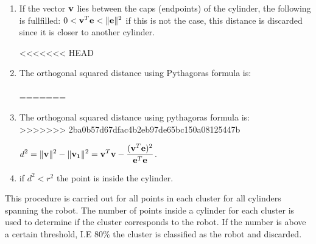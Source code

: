 \begin{enumerate}
\item If the vector $\bf v$ lies between the caps (endpoints) of the cylinder, the following is fullfilled: $ 0 < {\bf v}^T{\bf e} < \| {\bf e}\|^2$ if this is not the case, this distance is discarded since it is closer to another cylinder. 

<<<<<<< HEAD
\item The orthogonal squared distance using Pythagoras formula is:\\\\
=======
\item The orthogonal squared distance using pythagoras formula is:\\
>>>>>>> 2ba0b57d67dfac4b2eb97de65bc150a08125447b
\begin{center}
$\displaystyle d^2 = \|{\bf v}\|^2 - \|{\bf v_1}\|^2= {\bf v}^T{\bf v} -\frac{({\bf v}^T{\bf e})^2}{{\bf e}^T {\bf e}}$. 
\end{center}


\item if $d^2 < r^2$ the point is inside the cylinder.
\end{enumerate}

This procedure is carried out for all points in each cluster for all cylinders spanning the robot. The number of points inside a cylinder for each cluster is used to determine if the cluster corresponds to the robot. If the number is above a certain threshold, I.E 80\% the cluster is classified as the robot and discarded.
